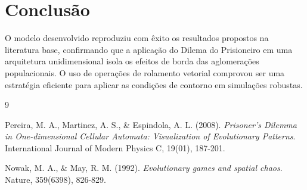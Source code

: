 \documentclass[12pt]{article}
\begin{document}
\section{Conclusão}
O modelo desenvolvido reproduziu com êxito os resultados propostos na literatura base, confirmando que a aplicação do Dilema do Prisioneiro em uma arquitetura unidimensional isola os efeitos de borda das aglomerações populacionais. O uso de operações de rolamento vetorial comprovou ser uma estratégia eficiente para aplicar as condições de contorno em simulações robustas.

\begin{thebibliography}{9}

Pereira, M. A., Martinez, A. S., \& Espindola, A. L. (2008). 
\textit{Prisoner's Dilemma in One-dimensional Cellular Automata: Visualization of Evolutionary Patterns}. 
International Journal of Modern Physics C, 19(01), 187-201.

Nowak, M. A., \& May, R. M. (1992). 
\textit{Evolutionary games and spatial chaos}. 
Nature, 359(6398), 826-829.

\end{thebibliography}
\end{document}
